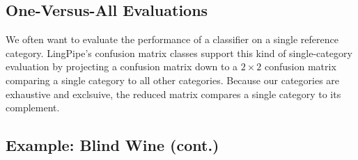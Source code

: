 \subsection{One-Versus-All Evaluations}\label{section:classifier-eval-one-versus-all}

We often want to evaluate the performance of a classifier on a single
reference category.  LingPipe's confusion matrix classes support this
kind of single-category evaluation by projecting a confusion matrix
down to a $2 \times 2$ confusion matrix comparing a single category to
all other categories.  Because our categories are exhaustive and
exclsuive, the reduced matrix compares a single category to its
complement.

\subsection{Example: Blind Wine (cont.)}

